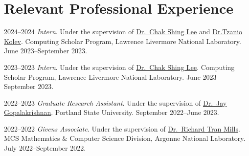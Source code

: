 \documentclass[12pt,letterpaper]{report}
\begin{document}


         

    
    	

	\section*{Relevant Professional Experience}

	\begin{tablist}

        \item[2024--2024] \emph{Intern}. Under the supervision of \href{https://people.llnl.gov/lee1029}{Dr.~Chak Shing Lee} and \href{https://people.llnl.gov/kolev1}{Dr.Tzanio Kolev}. Computing Scholar Program, Lawrence Livermore National Laboratory. June 2023--September 2023.

        \item[2023--2023] \emph{Intern}. Under the supervision of \href{https://people.llnl.gov/lee1029}{Dr.~Chak Shing Lee}. Computing Scholar Program, Lawrence Livermore National Laboratory. June 2023--September 2023.

        \item[2022--2023] \emph{Graduate Research Assistant}. Under the supervision of \href{https://web.pdx.edu/~gjay/}{Dr.~Jay Gopalakrishnan}. Portland State University. September 2022--June 2023.

        \item[2022--2022] \emph{Givens Associate}. Under the supervision of \href{https://climatemodeling.org/~rmills/}{Dr.~Richard Tran Mills}. MCS Mathematics \& Computer Science Division, Argonne National Laboratory. July 2022--September 2022.

	\end{tablist}
\end{document}
